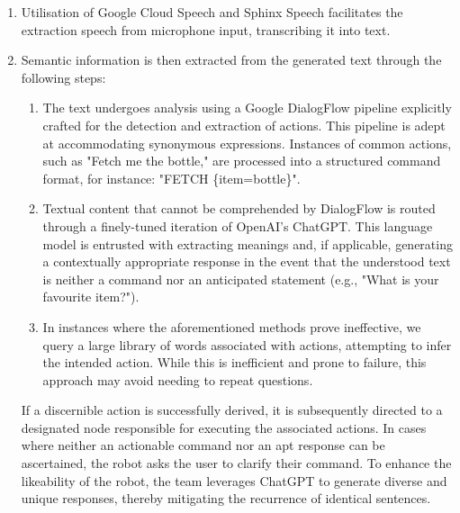 \begin{enumerate}
    \item Utilisation of Google Cloud Speech and Sphinx Speech facilitates the extraction speech from microphone input, transcribing it into text.
    \item Semantic information is then extracted from the generated text through the following steps:
    \begin{enumerate}
        \item The text undergoes analysis using a Google DialogFlow pipeline explicitly crafted for the detection and extraction of actions. This pipeline is adept at accommodating synonymous expressions. Instances of common actions, such as "Fetch me the bottle," are processed into a structured command format, for instance: "FETCH \{item=bottle\}".
        \item Textual content that cannot be comprehended by DialogFlow is routed through a finely-tuned iteration of OpenAI's ChatGPT. This language model is entrusted with extracting meanings and, if applicable, generating a contextually appropriate response in the event that the understood text is neither a command nor an anticipated statement (e.g., "What is your favourite item?").
        \item In instances where the aforementioned methods prove ineffective, we query a large library of words associated with actions, attempting to infer the intended action. While this is inefficient and prone to failure, this approach may avoid needing to repeat questions. 
    \end{enumerate}
    If a discernible action is successfully derived, it is subsequently directed to a designated node responsible for executing the associated actions. In cases where neither an actionable command nor an apt response can be ascertained, the robot asks the user to clarify their command. To enhance the likeability of the robot, the team leverages ChatGPT to generate diverse and unique responses, thereby mitigating the recurrence of identical sentences.
\end{enumerate}
